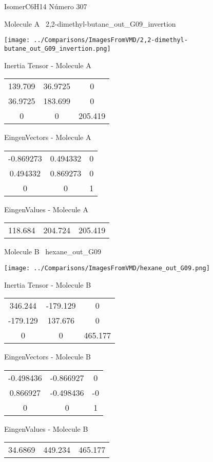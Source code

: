\vtab[-3cm]
\begin{center}
{\large IsomerC6H14 \tab Número 307}
\end{center}
\begin{multicols}{2}
\begin{center}

Molecule A \
2,2-dimethyl-butane\_out\_G09\_invertion

\texttt{[image: ../Comparisons/ImagesFromVMD/2,2-dimethyl-butane\_out\_G09\_invertion.png]}

Inertia Tensor - Molecule A \\
\begin{tabular}{|c c c|}
139.709	 & 	36.9725	 & 	0	 \\
36.9725	 & 	183.699	 & 	0	 \\
0	 & 	0	 & 	205.419
\end{tabular}

\vtab
 EingenVectors - Molecule A     \\
\begin{tabular}{|c c c|}
-0.869273	 & 	0.494332	 & 	0	 \\
0.494332	 & 	0.869273	 & 	0	 \\
0	 & 	0	 & 	1
\end{tabular}

\vtab
 EingenValues - Molecule A     \\
\begin{tabular}{|c c c|}
118.684	 & 	204.724	 & 	205.419	 \\
\end{tabular}
\columnbreak

Molecule B \
hexane\_out\_G09

\texttt{[image: ../Comparisons/ImagesFromVMD/hexane\_out\_G09.png]}

Inertia Tensor - Molecule B \\
\begin{tabular}{|c c c|}
346.244	 & 	-179.129	 & 	0	 \\
-179.129	 & 	137.676	 & 	0	 \\
0	 & 	0	 & 	465.177
\end{tabular}

\vtab
 EingenVectors - Molecule B     \\
\begin{tabular}{|c c c|}
-0.498436	 & 	-0.866927	 & 	0	 \\
0.866927	 & 	-0.498436	 & 	-0	 \\
0	 & 	0	 & 	1
\end{tabular}

\vtab
 EingenValues - Molecule B     \\
\begin{tabular}{|c c c|}
34.6869	 & 	449.234	 & 	465.177	 \\
\end{tabular}

\end{center}
\end{multicols}

